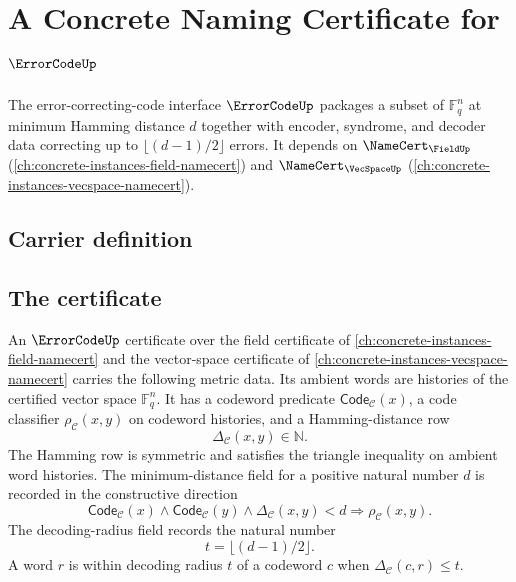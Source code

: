 \chapter{A Concrete Naming Certificate for $\ErrorCodeUp$}
\label{ch:concrete-instances-errorcode-namecert}

The error-correcting-code interface $\ErrorCodeUp$ packages a subset of $\mathbb{F}_q^n$ at minimum Hamming distance $d$ together with encoder, syndrome, and decoder data correcting up to $\lfloor (d-1)/2 \rfloor$ errors. It depends on $\NameCert_{\FieldUp}$ (\autoref{ch:concrete-instances-field-namecert}) and $\NameCert_{\VecSpaceUp}$ (\autoref{ch:concrete-instances-vecspace-namecert}).

\section{Carrier definition}
\label{sec:errorcode-carrier}

\section{The certificate}
\label{sec:errorcode-certificate}

\begin{definition}
\label{def:errorcode-minimum-distance-decoding-interface}
An $\ErrorCodeUp$ certificate over the field certificate of \autoref{ch:concrete-instances-field-namecert} and the vector-space certificate of \autoref{ch:concrete-instances-vecspace-namecert} carries the following metric data. Its ambient words are histories of the certified vector space $\mathbb{F}_q^n$. It has a codeword predicate $\mathsf{Code}_{\mathcal C}(x)$, a code classifier $\rho_{\mathcal C}(x,y)$ on codeword histories, and a Hamming-distance row
$$
\Delta_{\mathcal C}(x,y)\in\mathbb{N}.
$$
The Hamming row is symmetric and satisfies the triangle inequality on ambient word histories. The minimum-distance field for a positive natural number $d$ is recorded in the constructive direction
$$
\mathsf{Code}_{\mathcal C}(x)\land
\mathsf{Code}_{\mathcal C}(y)\land
\Delta_{\mathcal C}(x,y)<d
\Longrightarrow
\rho_{\mathcal C}(x,y).
$$
The decoding-radius field records the natural number
$$
t=\lfloor(d-1)/2\rfloor.
$$
A word $r$ is within decoding radius $t$ of a codeword $c$ when $\Delta_{\mathcal C}(c,r)\le t$.
\end{definition}

